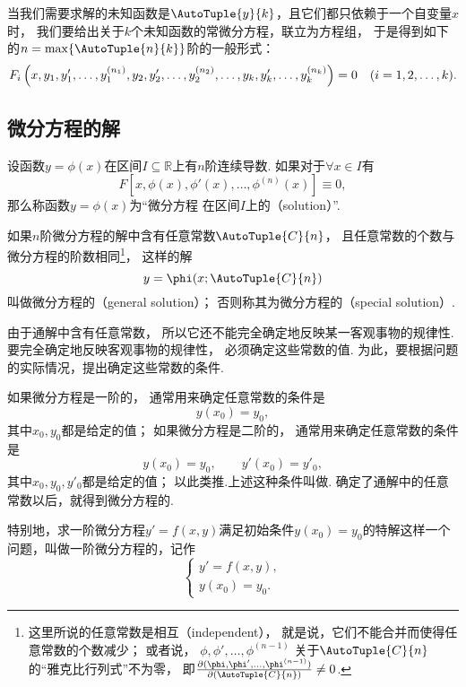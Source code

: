 当我们需要求解的未知函数是\(\AutoTuple{y}{k}\)，且它们都只依赖于一个自变量\(x\)时，
我们要给出关于\(k\)个未知函数的常微分方程，联立为方程组，
于是得到如下的\(n = \max\{\AutoTuple{n}{k}\}\)阶的一般形式：
\[
\def\y#1{y_{#1},y_{#1}',\dotsc,y_{#1}^{(n_#1)}}%
F_i\left(x,\y{1},\y{2},\dotsc,\y{k}\right)=0
\quad(i=1,2,\dotsc,k).
\]

\subsection{微分方程的解}
\begin{definition}
设函数\(y=\phi(x)\)在区间\(I\subseteq\mathbb{R}\)上有\(n\)阶连续导数.
如果对于\(\forall x \in I\)有\[
F\left[x,\phi(x),\phi'(x),\dotsc,\phi^{(n)}(x)\right]\equiv0,
\]
那么称函数\(y=\phi(x)\)为“微分方程  在区间\(I\)上的（solution）”.

如果\(n\)阶微分方程的解中含有任意常数\(\AutoTuple{C}{n}\)，
且任意常数的个数与微分方程的阶数相同\footnote{%
这里所说的任意常数是相互（independent），
就是说，它们不能合并而使得任意常数的个数减少；%
或者说，
\(\phi,\phi',\dotsc,\phi^{(n-1)}\)%
关于\(\AutoTuple{C}{n}\)的“雅克比行列式”不为零，
即\(\jacobi{\phi,\phi',\dotsc,\phi^{(n-1)}}{\AutoTuple{C}{n}} \neq 0\).}，
这样的解\[
y = \phi(x;\AutoTuple{C}{n})
\]叫做微分方程的（general solution）；
否则称其为微分方程的（special solution）.
\end{definition}

由于通解中含有任意常数，
所以它还不能完全确定地反映某一客观事物的规律性.
要完全确定地反映客观事物的规律性，
必须确定这些常数的值.
为此，要根据问题的实际情况，提出确定这些常数的条件.

如果微分方程是一阶的，
通常用来确定任意常数的条件是\[
y(x_0) = y_0,
\]其中\(x_0,y_0\)都是给定的值；
如果微分方程是二阶的，
通常用来确定任意常数的条件是\[
y(x_0) = y_0,
\qquad
y'(x_0) = y'_0,
\]其中\(x_0,y_0,y'_0\)都是给定的值；
以此类推.上述这种条件叫做.
确定了通解中的任意常数以后，就得到微分方程的.

特别地，求一阶微分方程\(y'=f(x,y)\)满足初始条件\(y(x_0) = y_0\)的特解这样一个问题，叫做一阶微分方程的，记作\[
\left\{ \begin{array}{l}
y' = f(x,y), \\
y(x_0) = y_0.
\end{array} \right.
\]


